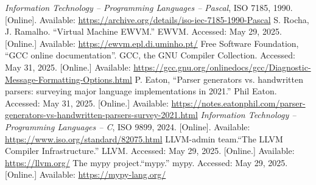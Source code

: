 \documentclass[12pt, a4paper]{article}
\begin{document}
\begin{thebibliography}{9}
        \emph{Information Technology -- Programming Languages -- Pascal}, ISO 7185, 1990. [Online].
        Available: \url{https://archive.org/details/iso-iec-7185-1990-Pascal}
        S. Rocha, J. Ramalho. ``Virtual Machine EWVM.'' EWVM. Accessed: May 29, 2025. [Online.]
        Available: \url{https://ewvm.epl.di.uminho.pt/}
        Free Software Foundation, ``GCC online documentation''. GCC, the GNU Compiler Collection.
        Accessed: May 31, 2025. [Online.] Available:
        \url{https://gcc.gnu.org/onlinedocs/gcc/Diagnostic-Message-Formatting-Options.html}
        P. Eaton, ``Parser generators vs. handwritten parsers: surveying major language
        implementations in 2021.'' Phil Eaton. Accessed: May 31, 2025. [Online.] Available:
        \url{https://notes.eatonphil.com/parser-generators-vs-handwritten-parsers-survey-2021.html}
        \emph{Information Technology -- Programming Languages -- C}, ISO 9899, 2024. [Online].
        Available: \url{https://www.iso.org/standard/82075.html}
        LLVM-admin team.``The LLVM Compiler Infrastructure.'' LLVM. Accessed: May 29, 2025.
        [Online.] Available: \url{https://llvm.org/}
        The mypy project.``mypy.'' mypy. Accessed: May 29, 2025. [Online.] Available:
        \url{https://mypy-lang.org/}
\end{thebibliography}
\endgroup
\end{document}
